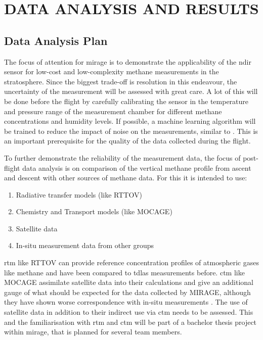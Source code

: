 \documentclass[
  a4paper,
  11pt,
  openany,
  parskip,
  toc=totoc,
  listof=totoc,
  bibliography=totoc
]{scrreprt}
\begin{document}

\chapter{DATA ANALYSIS AND RESULTS}
\label{sec:data_analysis_results}

\section{Data Analysis Plan}

The focus of attention for \gls{mirage} is to demonstrate the applicability of the \gls{ndir} sensor for low-cost and low-complexity methane measurements in the stratosphere.
Since the biggest trade-off is resolution in this endeavour, the uncertainty of the measurement will be assessed with great care.
A lot of this will be done before the flight by carefully calibrating the sensor in the temperature and pressure range of the measurement chamber for different methane concentrations and humidity levels.
If possible, a machine learning algorithm will be trained to reduce the impact of noise on the measurements, similar to \cite{gia_accurate_2025}. This is an important prerequisite for the quality of the data collected during the flight.

To further demonstrate the reliability of the measurement data, the focus of post-flight data analysis is on comparison of the vertical methane profile from ascent and descent with other sources of methane data.
For this it is intended to use:

\begin{enumerate}
    \item Radiative transfer models (like RTTOV)
    \item Chemistry and Transport models (like MOCAGE)
    \item Satellite data
    \item In-situ measurement data from other groups
\end{enumerate}

\gls{rtm} like RTTOV can provide reference concentration profiles of atmospheric gases like methane and have been compared to \gls{tdlas} measurements before.
\gls{ctm} like MOCAGE assimilate satellite data into their calculations and give an additional gauge of what should be expected for the data collected by MIRAGE, although they have shown worse correspondence with in-situ measurements \cite{joly2020}.
The use of satellite data in addition to their indirect use via \gls{ctm} needs to be assessed.
This and the familiarisation with \gls{rtm} and \gls{ctm} will be part of a bachelor thesis project within \gls{mirage}, that is planned for several team members.
\end{document}

